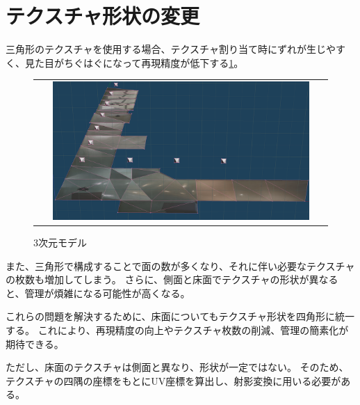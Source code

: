 \documentclass[]{jarticle}          %
\begin{document}
\section{テクスチャ形状の変更}
三角形のテクスチャを使用する場合、テクスチャ割り当て時にずれが生じやすく、見た目がちぐはぐになって再現精度が低下する\ref{one}。
\begin{figure}[H]
  \begin{center}
    \begin{tabular}{c}
      \includegraphics[width=0.9\textwidth]{figures/3dmodel1.png}
    \end{tabular}
  \end{center}
  \caption{3次元モデル}
  \label{one}
\end{figure}
また、三角形で構成することで面の数が多くなり、それに伴い必要なテクスチャの枚数も増加してしまう。
さらに、側面と床面でテクスチャの形状が異なると、管理が煩雑になる可能性が高くなる。

これらの問題を解決するために、床面についてもテクスチャ形状を四角形に統一する。
これにより、再現精度の向上やテクスチャ枚数の削減、管理の簡素化が期待できる。

ただし、床面のテクスチャは側面と異なり、形状が一定ではない。
そのため、テクスチャの四隅の座標をもとにUV座標を算出し、射影変換に用いる必要がある。
\end{document}
